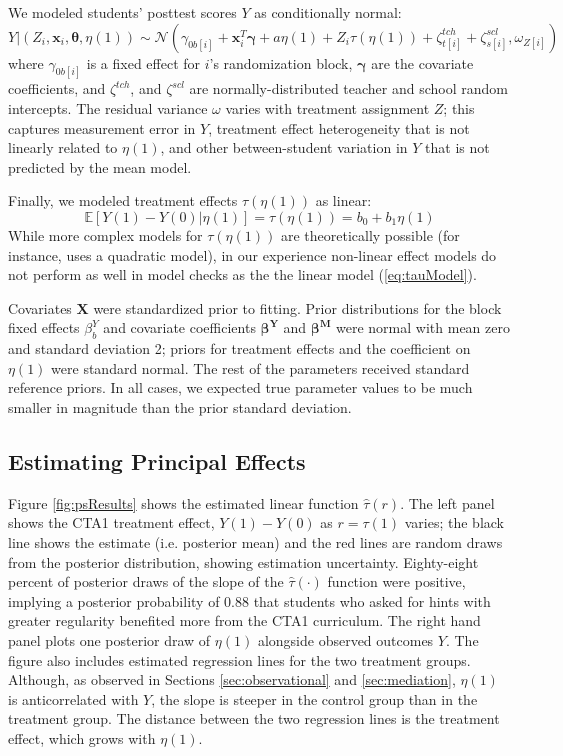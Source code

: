 \documentclass{article}\usepackage[]{graphicx}\usepackage[]{color}
\newcommand{\EE}{\mathbb{E}}
\begin{document}
We modeled students' posttest scores $Y$ as
conditionally normal:
\begin{equation}\label{eq:outcomeSubmodel}
 Y|\left(Z_i,\bm{x}_i,\bm{\theta},\eta(1)\right) \sim  \mathcal{N}\left(
\gamma_{0b[i]}+\bm{x}_i^T\bm{\gamma}+a\eta(1)+Z_i\tau(\eta(1))+\zeta^{tch}_{t[i]}+\zeta^{scl}_{s[i]},\omega_{Z[i]}\right)
\end{equation}
where $\gamma_{0b[i]}$ is a fixed effect for $i$'s randomization block, $\bm{\gamma}$ are the
covariate coefficients, and $\zeta^{tch}$, and
$\zeta^{scl}$ are normally-distributed teacher and school random
intercepts.
The residual variance $\omega$ varies with treatment assignment $Z$;
this captures measurement error in $Y$, treatment effect heterogeneity
that is not linearly related to
$\eta(1)$, and other between-student variation in $Y$ that is not predicted by
the mean model.

Finally, we modeled treatment effects
$\tau(\eta(1))$ as linear:
\begin{equation}\label{eq:tauModel}
\EE[Y(1)-Y(0)|\eta(1)]=\tau({\eta(1)})=b_0+b_1\eta(1)
\end{equation}
While more complex models for $\tau(\eta(1))$ are theoretically
possible (for instance, \citet{jin2008principal} uses a quadratic
model), in our experience non-linear effect models do not perform as
well in model checks as the the linear model (\ref{eq:tauModel}).

Covariates $\bm{X}$ were standardized prior to fitting.
Prior distributions for the block fixed effects $\beta^Y_b$ and covariate coefficients
$\bm{\beta^Y}$ and $\bm{\beta^M}$ were normal with mean zero and
standard deviation 2;
priors for treatment effects and the coefficient on $\eta(1)$ were standard
normal.
The rest of the parameters received standard reference priors.
In all cases, we expected true parameter values to be much smaller in
magnitude than the prior standard deviation.

\subsection{Estimating Principal Effects}\label{sec:PSest}

Figure \ref{fig:psResults} shows the estimated linear function
$\hat{\tau}(r)$.
The left panel shows the CTA1 treatment effect, $Y(1)-Y(0)$ as
$r=\tau(1)$ varies; the black line shows the estimate (i.e. posterior
mean) and the red lines are random draws from the posterior
distribution, showing estimation uncertainty.
Eighty-eight percent of posterior draws of the slope of the
$\hat{\tau}(\cdot)$ function were positive, implying a posterior
probability of 0.88 that students who asked for hints
with greater regularity benefited more from the CTA1 curriculum.
The right hand panel plots one posterior draw of $\eta(1)$
alongside observed outcomes $Y$.
The figure also includes estimated regression lines for the two
treatment groups.
Although, as observed in Sections \ref{sec:observational} and
\ref{sec:mediation}, $\eta(1)$ is anticorrelated with $Y$, the slope
is steeper in the control group than in the treatment group.
The distance between the two regression lines is the treatment effect,
which grows with $\eta(1)$.
\end{document}
